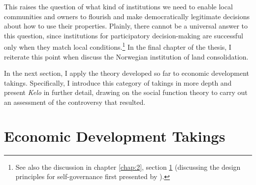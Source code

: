 This raises the question of what kind of institutions we need to enable local communities and owners to flourish and make democratically legitimate decisions about how to use their properties. Plainly, there cannot be a universal answer to this question, since institutions for participatory decision-making are successful only when they match local conditions.\footnote{See also the discussion in chapter \ref{chap:2}, section \ref{sec:2:6} (discussing the design principles for self-governance first presented by \cite{ostrom90}).} In the final chapter of the thesis, I reiterate this point when discuss the Norwegian institution of land consolidation.

In the next section, I apply the theory developed so far to economic development takings. Specifically, I introduce this category of takings in more depth and present {\it Kelo} in further detail, drawing on the social function theory to carry out an assessment of the controversy that resulted.

\section{Economic Development Takings}\label{sec:2:6}

